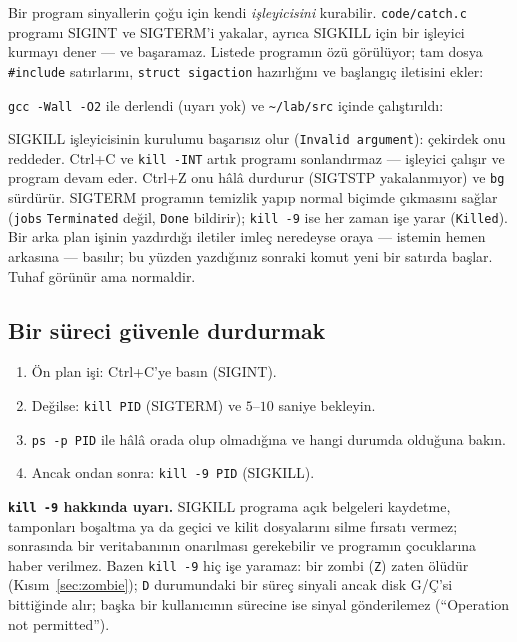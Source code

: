 \documentclass[11pt,a4paper]{article}
\newcommand{\cmd}[1]{\texttt{#1}}
\begin{document}
Bir program sinyallerin çoğu için kendi \emph{işleyicisini} kurabilir. \texttt{code/catch.c} programı SIGINT ve SIGTERM'i yakalar, ayrıca SIGKILL için bir işleyici kurmayı dener --- ve başaramaz. Listede programın özü görülüyor; tam dosya \texttt{\#include} satırlarını, \texttt{struct sigaction} hazırlığını ve başlangıç iletisini ekler:



\cmd{gcc -Wall -O2} ile derlendi (uyarı yok) ve \texttt{\textasciitilde/lab/src} içinde çalıştırıldı:



SIGKILL işleyicisinin kurulumu başarısız olur (\texttt{Invalid argument}): çekirdek onu reddeder. Ctrl+C ve \cmd{kill -INT} artık programı sonlandırmaz --- işleyici çalışır ve program devam eder. Ctrl+Z onu hâlâ durdurur (SIGTSTP yakalanmıyor) ve \cmd{bg} sürdürür. SIGTERM programın temizlik yapıp normal biçimde çıkmasını sağlar (\cmd{jobs} \texttt{Terminated} değil, \texttt{Done} bildirir); \cmd{kill -9} ise her zaman işe yarar (\texttt{Killed}).
Bir arka plan işinin yazdırdığı iletiler imleç neredeyse oraya --- istemin hemen arkasına --- basılır; bu yüzden yazdığınız sonraki komut yeni bir satırda başlar. Tuhaf görünür ama normaldir.

\subsection{Bir süreci güvenle durdurmak}

\begin{keyidea}
\begin{enumerate}[leftmargin=1.4em]
  \item Ön plan işi: Ctrl+C'ye basın (SIGINT).
  \item Değilse: \cmd{kill PID} (SIGTERM) ve $5$--$10$ saniye bekleyin.
  \item \cmd{ps -p PID} ile hâlâ orada olup olmadığına ve hangi durumda olduğuna bakın.
  \item Ancak ondan sonra: \cmd{kill -9 PID} (SIGKILL).
\end{enumerate}
\end{keyidea}

\textbf{\cmd{kill -9} hakkında uyarı.} SIGKILL programa açık belgeleri kaydetme, tamponları boşaltma ya da geçici ve kilit dosyalarını silme fırsatı vermez; sonrasında bir veritabanının onarılması gerekebilir ve programın çocuklarına haber verilmez. Bazen \cmd{kill -9} hiç işe yaramaz: bir zombi (\texttt{Z}) zaten ölüdür (Kısım~\ref{sec:zombie}); \texttt{D} durumundaki bir süreç sinyali ancak disk G/Ç'si bittiğinde alır; başka bir kullanıcının sürecine ise sinyal gönderilemez (``Operation not permitted'').
\end{document}
